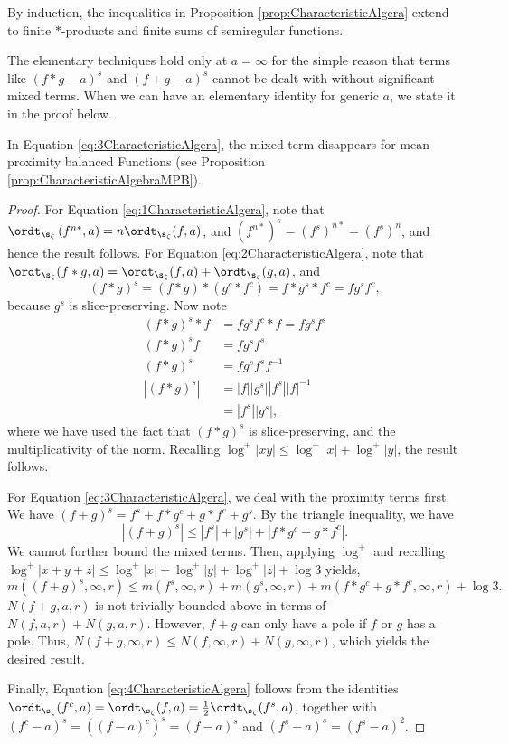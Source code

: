 \documentclass{amsart}
\begin{document}
\begin{remark}
By induction, the inequalities in Proposition \ref{prop:CharacteristicAlgera} extend to finite \(*\)-products and finite sums of semiregular functions.
\end{remark}

\begin{remark}
    The elementary techniques hold only at $a=\infty$ for the simple reason that terms like $(f*g-a)^s$ and $(f+g-a)^s$ cannot be dealt with without significant mixed terms. When we can have an elementary identity for generic $a$, we state it in the proof below. 
    
     In Equation \ref{eq:3CharacteristicAlgera}, the mixed term disappears for mean proximity balanced Functions (see Proposition \ref{prop:CharacteristicAlgebraMPB}). 
\end{remark}

\begin{proof}
    For Equation \ref{eq:1CharacteristicAlgera}, note that $\ordt_{\s_\zeta}\left(f^{n*},a\right)=n\ordt_{\s_\zeta}(f,a)$, and $(f^{n*})^s=(f^s)^{n*}=(f^s)^n$, and hence the result follows. For Equation \ref{eq:2CharacteristicAlgera}, note that $\ordt_{\s_\zeta}(f*g,a)=\ordt_{\s_\zeta}(f,a)+\ordt_{\s_\zeta}(g,a)$, and \[(f*g)^s=(f*g)*(g^c*f^c)=f*g^s*f^c=fg^sf^c,\] because $g^s$ is slice-preserving. Now note \begin{align*}
        (f*g)^s*f&=fg^sf^c*f =fg^sf^s \\
        (f*g)^sf&=fg^sf^s \\
        (f*g)^s&=fg^sf^sf^{-1}\\
        |(f*g)^s|&=|f||g^s||f^s||f|^{-1}\\
        &=|f^s||g^s|,
    \end{align*} where we have used the fact that $(f*g)^s$ is slice-preserving, and the multiplicativity of the norm. Recalling $\log^+|xy|\leq \log^+|x|+\log^+|y|$, the result follows. 

    For Equation \ref{eq:3CharacteristicAlgera}, we deal with the proximity terms first. We have \((f+g)^s=f^s+f*g^c+g*f^c+g^s.\) By the triangle inequality, we have \[|(f+g)^s|\leq |f^s|+|g^s|+|f*g^c+g*f^c|.\] We cannot further bound the mixed terms. Then, applying $\log^+$ and recalling $\log^+|x+y+z|\leq \log^+|x|+\log^+|y|+\log^+|z|+\log 3$ yields, \[m((f+g)^s,\infty,r)\leq m(f^s,\infty,r)+m(g^s,\infty,r)+m(f*g^c+g*f^c,\infty,r)+\log 3.\] $N(f+g,a,r)$ is not trivially bounded above in terms of $N(f,a,r)+N(g,a,r)$. However, $f+g$ can only have a pole if $f$ or $g$ has a pole. Thus, $N(f+g,\infty,r)\leq N(f,\infty, r)+N(g,\infty,r)$, which yields the desired result. 

    Finally, Equation \ref{eq:4CharacteristicAlgera} follows from the identities \(\ordt_{\s_\zeta}(f^c,a)=\ordt_{\s_\zeta}(f,a)=\tfrac12\ordt_{\s_\zeta}(f^s,a)\), together with \((f^c-a)^s=((f-a)^c)^s=(f-a)^s\) and \((f^s-a)^s=(f^s-a)^2\).
\end{proof}
\end{document}
